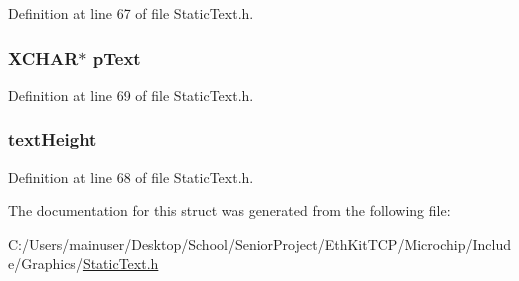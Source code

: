 Definition at line 67 of file Static\+Text.\+h.

\hypertarget{struct_s_t_a_t_i_c_t_e_x_t_a934b5563cdaf14803728ff3a7b7e8c7f}{}
\subsubsection[{p\+Text}]{\setlength{\rightskip}{0pt plus 5cm}X\+C\+H\+A\+R$\ast$ p\+Text}\label{struct_s_t_a_t_i_c_t_e_x_t_a934b5563cdaf14803728ff3a7b7e8c7f}


Definition at line 69 of file Static\+Text.\+h.

\hypertarget{struct_s_t_a_t_i_c_t_e_x_t_a40fa9c35391b0005032180b85e7afd34}{}
\subsubsection[{text\+Height}]{ text\+Height}\label{struct_s_t_a_t_i_c_t_e_x_t_a40fa9c35391b0005032180b85e7afd34}


Definition at line 68 of file Static\+Text.\+h.



The documentation for this struct was generated from the following file\+:\begin{DoxyCompactItemize}
\item 
C\+:/\+Users/mainuser/\+Desktop/\+School/\+Senior\+Project/\+Eth\+Kit\+T\+C\+P/\+Microchip/\+Include/\+Graphics/\hyperlink{_static_text_8h}{Static\+Text.\+h}\end{DoxyCompactItemize}
